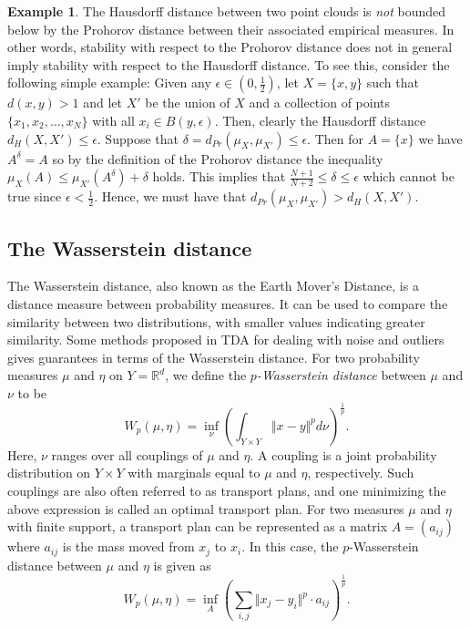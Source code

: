 \documentclass[10pt,a4paper]{article}
\theoremstyle{definition}
\newtheorem{ex}{Example}[thm]
\newcommand{\R}{\mathbb{R}}
\begin{document}

\begin{ex}
	The Hausdorff distance between two point clouds is \textit{not} bounded below by the Prohorov distance between their associated empirical measures. In other words, stability with respect to the Prohorov distance does not in general imply stability with respect to the Hausdorff distance. To see this, consider the following simple example: Given any $\epsilon\in(0,\frac{1}{2})$, let $X=\{x,y\}$ such that $d(x,y)>1$ and let $X'$ be the union of $X$ and a collection of points $\{x_1, x_2,\ldots,x_N\}$ with all $x_i\in B(y,\epsilon)$. Then, clearly the Hausdorff distance $d_H(X,X')\leq\epsilon$. Suppose that $\delta = d_{Pr}(\mu_X, \mu_{X'})\leq\epsilon$. Then for $A=\{x\}$ we have $A^\delta=A$ so by the definition of the Prohorov distance the inequality $\mu_X(A)\leq\mu_{X'}(A^\delta)+\delta$ holds. This implies that $\frac{N+1}{N+2}\leq\delta\leq\epsilon$ which cannot be true since $\epsilon<\frac{1}{2}$. Hence, we must have that $d_{Pr}(\mu_X, \mu_{X'})>d_H(X,X')$.
\end{ex}

\subsection{The Wasserstein distance}
The Wasserstein distance, also known as the Earth Mover's Distance, is a distance measure between probability measures. It can be used to compare the similarity between two distributions, with smaller values indicating greater similarity. Some methods proposed in TDA for dealing with noise and outliers gives guarantees in terms of the Wasserstein distance. For two probability measures $\mu$ and $\eta$ on $Y=\R^d$, we define the \textit{$p$-Wasserstein distance} between $\mu$ and $\nu$ to be
$$
W_p(\mu, \eta) = \inf_{\nu}\left(\int_{Y\times Y}\Vert x-y\Vert^p d\nu\right)^{\frac{1}{p}}.
$$
Here, $\nu$ ranges over all couplings of $\mu$ and $\eta$. A coupling is a joint probability distribution on $Y\times Y$ with marginals equal to $\mu$ and $\eta$, respectively. Such couplings are also often referred to as transport plans, and one minimizing the above expression is called an optimal transport plan. For two measures $\mu$ and $\eta$ with finite support, a transport plan can be represented as a matrix $A=(a_{ij})$ where $a_{ij}$ is the mass moved from $x_j$ to $x_i$. In this case, the $p$-Wasserstein distance between $\mu$ and $\eta$ is given as
$$
W_p(\mu, \eta) = \inf_A \left(\sum_{i,j}\Vert x_j - y_i\Vert^p\cdot a_{ij}\right)^{\frac{1}{p}}.
$$
\end{document}
